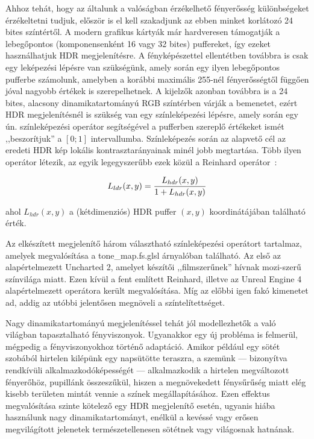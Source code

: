 Ahhoz tehát, hogy az általunk a valóságban érzékelhető fényerősség különbségeket érzékeltetni tudjuk, először is el kell szakadjunk az ebben minket korlátozó 24 bites színtértől. A modern grafikus kártyák már hardveresen támogatják a lebegőpontos (komponensenként 16 vagy 32 bites) puffereket, így ezeket használhatjuk HDR megjelenítésre. A fényképészettel ellentétben továbbra is csak egy leképezési lépésre van szükségünk, amely során egy ilyen lebegőpontos pufferbe számolunk, amelyben a korábbi maximális 255-nél fényerősségtől függően jóval nagyobb értékek is szerepelhetnek. A kijelzők azonban továbbra is a 24 bites, alacsony dinamikatartományú RGB színtérben várják a bemenetet, ezért HDR megjelenítésnél is szükség van egy színleképezési lépésre, amely során egy ún. színleképezési operátor segítségével a pufferben szereplő értékeket ismét ,,beszorítjuk'' a \([0; 1]\) intervallumba. Színleképezés során az alapvető cél az eredeti HDR kép lokális kontrasztarányainak minél jobb megtartása. Több ilyen operátor létezik, az egyik legegyszerűbb ezek közül a Reinhard operátor~\cite{reinhard2002photographic}:

\[
L_{ldr}(x, y) = { L_{hdr}(x, y) \over 1 + L_{hdr}(x, y) }
\]

ahol \(L_{hdr}(x, y)\) a (kétdimenziós) HDR puffer \((x, y)\) koordinátájában található érték.

Az elkészített megjelenítő három választható színleképezési operátort tartalmaz, amelyek megvalósítása a tone\_map.fs.glsl árnyalóban található. Az első az alapértelmezett Uncharted 2, amelyet készítői ,,filmszerűnek'' hívnak mozi-szerű színvilága miatt. Ezen kívül a fent említett Reinhard, illetve az Unreal Engine 4 alapértelmezett operátora került megvalósítása. Míg az előbbi igen fakó kimenetet ad, addig az utóbbi jelentősen megnöveli a színtelítettséget.

Nagy dinamikatartományú megjelenítéssel tehát jól modellezhetők a való világban tapasztalható fényviszonyok. Ugyanakkor egy új probléma is felmerül, mégpedig a fényviszonyokhoz történő adaptáció. Amikor például egy sötét szobából hirtelen kilépünk egy napsütötte teraszra, a szemünk --- bizonyítva rendkívüli alkalmazkodóképességét --- alkalmazkodik a hirtelen megváltozott fényerőhöz, pupillánk összeszűkül, hiszen a megnövekedett fénysűrűség miatt elég kisebb területen mintát vennie a színek megállapításához. Ezen effektus megvalósítása szinte kötelező egy HDR megjelenítő esetén, ugyanis hiába használunk nagy dinamikatartományt, enélkül a kevéssé vagy erősen megvilágított jelenetek természetellenesen sötétnek vagy világosnak hatnának.

